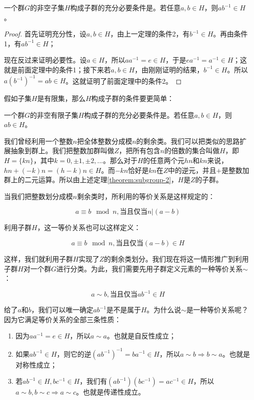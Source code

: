 \documentclass{article}
\begin{document}
\begin{theorem}
一个群$G$的非空子集$H$构成子群的充分必要条件是。若任意$a, b \in H$，则$ab^{-1} \in H$。
\label{theorem:subgroup-2}
\end{theorem}

\begin{proof}
首先证明充分性，设$a, b \in H$，由上一定理的条件2，有$b^{-1} \in H$。再由条件1，有$ab^{-1} \in H$；

现在反过来证明必要性。设$a \in H$，所以$aa^{-1} = e \in H$，于是$ea^{-1} = a^{-1} \in H$；这就是前面定理中的条件1；接下来若$a, b \in H$，由刚刚证明的结果，$b^{-1} \in H$。所以$a(b^{-1})^{-1} = ab \in H$。这就证明了前面定理中的条件2。
\end{proof}

假如子集$H$是有限集，那么$H$构成子群的条件要更简单：

\begin{theorem}
一个群$G$的非空有限子集$H$构成子群的充分必要条件是。若任意$a, b \in H$，则$ab \in H$。
\end{theorem}

我们曾经利用一个整数$n$把全体整数分成模$n$的剩余类。我们可以把类似的思路扩展抽象到群上。我们把整数加群叫做$Z$，把所有包含$n$的倍数的集合叫做$H$，即$H = \{ kn \}$，其中$k = 0, \pm 1, \pm 2, ...$。那么对于$H$的任意两个元$hn$和$kn$来说，$hn + (-k)n = (h - k)n \in H$。而$-kn$恰好是$kn$在$Z$中的逆元，并且$+$是整数加群上的二元运算。所以由上述定理\ref{theorem:subgroup-2}，$H$是$Z$的子群。

当我们把整数划分成模$n$剩余类时，所利用的等价关系是这样规定的：

\[
a \equiv b \mod n, \text{当且仅当} n | (a - b)
\]

利用子群$H$，这一等价关系也可以这样定义：

\[
a \equiv b \mod n, \text{当且仅当} (a - b) \in H
\]

这样，我们就利用子群$H$实现了$Z$的剩余类划分。我们现在将这一情形推广到利用子群$H$对一个群$G$进行分类。为此，我们需要先用子群定义元素的一种等价关系$\sim$：

\[
a \sim b, \text{当且仅当} ab^{-1} \in H
\]

给了$a$和$b$，我们可以唯一确定$ab^{-1}$是不是属于$H$。为什么说$\sim$是一种等价关系呢？因为它满足等价关系的全部三条性质：

\begin{enumerate}
\item 因为$aa^{-1} = e \in H$，所以$a \sim a$。也就是自反性成立；
\item 如果$ab^{-1} \in H$，则它的逆$(ab^{-1})^{-1}= ba^{-1} \in H$，所以$a \sim b \Rightarrow b \sim a$。也就是对称性成立；
\item 若$ab^{-1} \in H, bc^{-1} \in H$，我们有$(ab^{-1})(bc^{-1}) = ac^{-1} \in H$，所以$a \sim b, b \sim c \Rightarrow a \sim c$。也就是传递性成立。
\end{enumerate}
\end{document}
